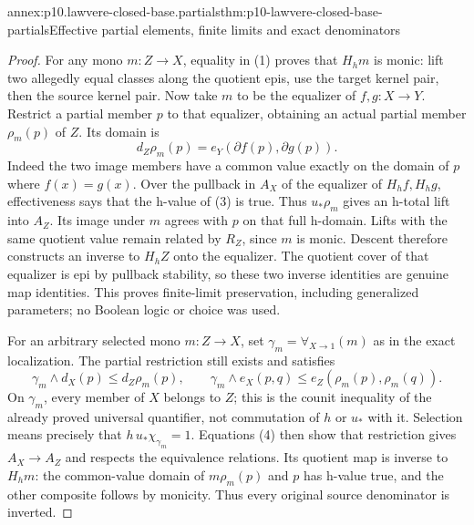 \begin{annexitem}{annex:p10.lawvere-closed-base.partials}{thm:p10-lawvere-closed-base-partials}{Effective partial elements, finite limits and exact denominators}
\begin{proof}
For any mono \(m:Z\to X\), equality in (1) proves that
\(H_hm\) is monic: lift two allegedly equal classes along the
quotient epis, use the target kernel pair, then the source kernel
pair. Now take \(m\) to be the equalizer of \(f,g:X\to Y\).
Restrict a partial member \(p\) to that equalizer, obtaining an
actual partial member \(\rho_m(p)\) of \(Z\). Its domain is
\[
             d_Z\rho_m(p)=e_Y(\partial f(p),\partial g(p)).
                                                               \tag{3}
\]
Indeed the two image members have a common value exactly on the
domain of \(p\) where \(f(x)=g(x)\). Over the pullback in
\(A_X\) of the equalizer of \(H_hf,H_hg\), effectiveness says
that the h-value of (3) is true. Thus \(u_*\rho_m\) gives an
h-total lift into \(A_Z\). Its image under \(m\) agrees with
\(p\) on that full h-domain. Lifts with the same quotient value
remain related by \(R_Z\), since \(m\) is monic. Descent
therefore constructs an inverse to \(H_hZ\) onto the equalizer.
The quotient cover of that equalizer is epi by pullback stability,
so these two inverse identities are genuine map identities. This
proves finite-limit preservation, including generalized parameters;
no Boolean logic or choice was used.

For an arbitrary selected mono \(m:Z\to X\), set
\(\gamma_m=\forall_{X\to1}(m)\) as in the exact localization.
The partial restriction still exists and satisfies
\[
 \gamma_m\wedge d_X(p)\le d_Z\rho_m(p),\qquad
 \gamma_m\wedge e_X(p,q)\le e_Z(\rho_m(p),\rho_m(q)).    \tag{4}
\]
On \(\gamma_m\), every member of \(X\) belongs to \(Z\);
this is the counit inequality of the already proved universal
quantifier, not commutation of \(h\) or \(u_*\) with it.
Selection means precisely that \(h\,u_*\chi_{\gamma_m}=1\).
Equations (4) then show that restriction gives \(A_X\to A_Z\)
and respects the equivalence relations. Its quotient map is inverse
to \(H_hm\): the common-value domain of \(m\rho_m(p)\)
and \(p\) has h-value true, and the other composite follows by
monicity. Thus every original source denominator is inverted.


\end{proof}
\end{annexitem}
